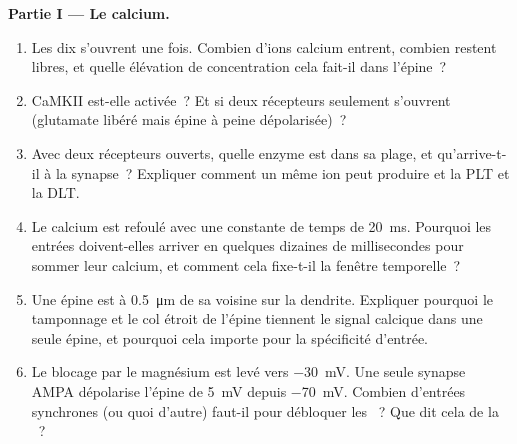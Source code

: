 \begin{problem}
\medskip
\noindent\textbf{Partie I --- Le calcium.}
\begin{enumerate}
  \item Les dix  s'ouvrent une fois. Combien d'ions
        calcium entrent, combien restent libres, et quelle élévation de
        concentration cela fait-il dans l'épine~?
  \item CaMKII est-elle activée~? Et si deux récepteurs seulement
        s'ouvrent (glutamate libéré mais épine à peine dépolarisée)~?
  \item Avec deux récepteurs ouverts, quelle enzyme est dans sa plage,
        et qu'arrive-t-il à la synapse~? Expliquer comment un même ion
        peut produire et la PLT et la DLT.
  \item Le calcium est refoulé avec une constante de temps de
        \qty{20}{ms}. Pourquoi les entrées doivent-elles arriver en
        quelques dizaines de millisecondes pour sommer leur calcium, et
        comment cela fixe-t-il la fenêtre temporelle~?
  \item Une épine est à \qty{0.5}{\micro m} de sa voisine sur la
        dendrite. Expliquer pourquoi le tamponnage et le col étroit de
        l'épine tiennent le signal calcique dans une seule épine, et
        pourquoi cela importe pour la spécificité d'entrée.
  \item Le blocage par le magnésium est levé vers \qty{-30}{mV}. Une
        seule synapse AMPA dépolarise l'épine de \qty{5}{mV} depuis
        \qty{-70}{mV}. Combien d'entrées synchrones (ou quoi d'autre)
        faut-il pour débloquer les ~? Que dit cela de la
        ~?
\end{enumerate}


\end{problem}
